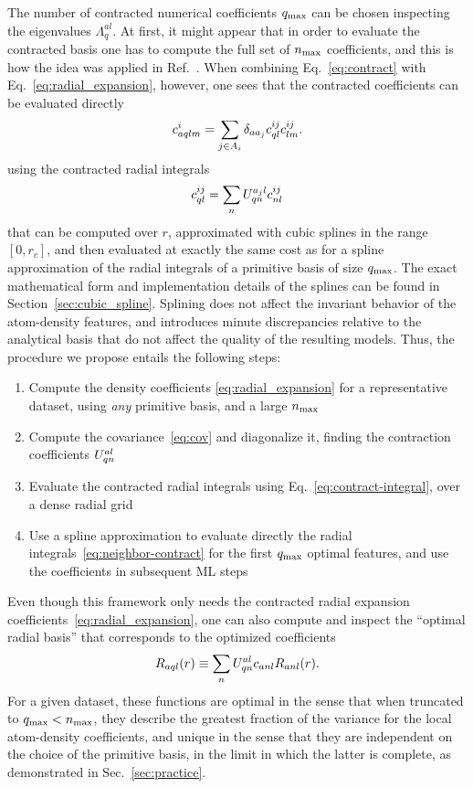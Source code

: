 The number of contracted numerical coefficients $q_\mathrm{max}$ can be chosen inspecting the eigenvalues $\Lambda^{al}_q$.
At first, it might appear that in order to evaluate the contracted basis one has to compute the full set of $n_\mathrm{max}$ coefficients, and this is how the idea was applied in Ref.~. 
When combining Eq.~\eqref{eq:contract} with Eq.~\eqref{eq:radial_expansion}, however, one sees that the contracted coefficients can be evaluated directly 
\begin{equation}
  c^{i}_{a qlm} = \sum_{j\in A_i} \delta_{aa_j} c^{ij}_{ql} c_{lm}^{ij}.
\label{eq:neighbor-contract}
\end{equation}
using the contracted radial integrals
\begin{equation}
  c^{ij}_{ql} = \sum_n U^{a_j l}_{qn} c^{ij}_{nl} \label{eq:contract-integral}
\end{equation}
that can be computed over $r$, approximated with cubic splines in the range $[0, r_c]$, and then evaluated at exactly the same cost as for a spline approximation of the radial integrals of a primitive basis of size $q_\mathrm{max}$.
The exact mathematical form and implementation details of the splines can be found in Section~\ref{sec:cubic_spline}.
Splining does not affect the invariant behavior of the atom-density features, and introduces minute discrepancies relative to the analytical basis that do not affect the quality of the resulting models. 
Thus, the procedure we propose entails the following steps:
\begin{enumerate}
\item Compute the density coefficients \eqref{eq:radial_expansion} for a representative dataset, using \emph{any} primitive basis, and a large $n_\mathrm{max}$
\item Compute the covariance~\eqref{eq:cov} and diagonalize it, finding the contraction coefficients $U^{a l}_{qn}$
\item Evaluate the contracted radial integrals using Eq.~\eqref{eq:contract-integral}, over a dense radial grid
\item Use a spline approximation to evaluate directly the radial integrals~\eqref{eq:neighbor-contract} for the first $q_\mathrm{max}$ optimal features, and use the coefficients in subsequent ML steps
\end{enumerate}

Even though this framework only needs the contracted radial expansion coefficients~\eqref{eq:radial_expansion}, one can also compute and inspect the ``optimal radial basis'' that corresponds to the optimized coefficients  
\begin{equation}
  R_{a ql}(r) \equiv \sum_n U^{a l}_{qn} c_{a nl} R_{a nl}(r). \label{eq:contract-basis}
\end{equation}
For a given dataset, these functions are optimal in the sense that when truncated to $q_\mathrm{max}<n_\mathrm{max}$, they describe the greatest fraction of the variance for the local atom-density coefficients, and unique in the sense that they are independent on the choice of the primitive basis, in the limit in which the latter is complete, as demonstrated in Sec.~\ref{sec:practice}.

